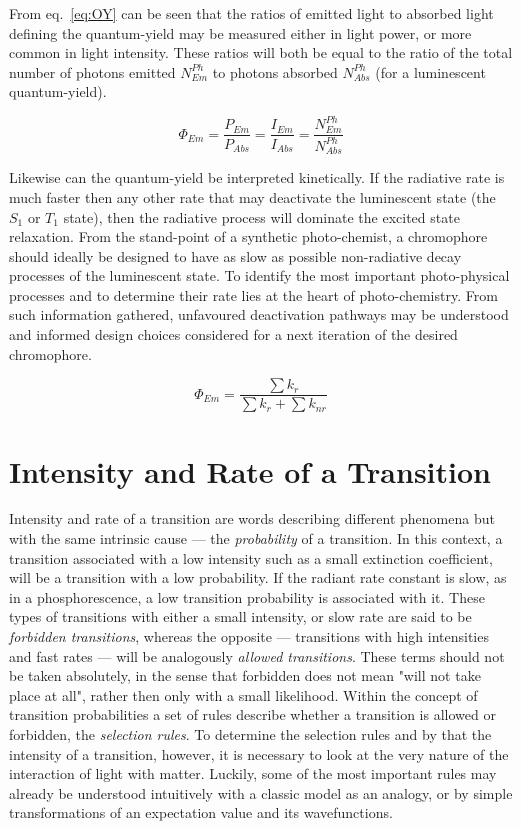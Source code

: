 			From eq.~\ref{eq:OY} can be seen that the ratios of emitted light to absorbed light defining the quantum-yield may be measured either in light power, or more common in light intensity. These ratios will both be equal to the ratio of the total number of photons emitted $N_{Em}^{Ph}$ to photons absorbed $N_{Abs}^{Ph}$ (for a luminescent quantum-yield).

			\begin{equation}
				\label{eq:QY}
		 		\Phi_{Em} = \frac{P_{Em}}{P_{Abs}} = \frac{I_{Em}}{I_{Abs}} = \frac{N_{Em}^{Ph}}{N_{Abs}^{Ph}}
			\end{equation}

			Likewise can the quantum-yield be interpreted kinetically. If the radiative rate is much faster then any other rate that may deactivate the luminescent state (the $S_1$ or $T_1$ state), then the radiative process will dominate the excited state relaxation. From the stand-point of a synthetic photo-chemist, a chromophore should ideally be designed to have as slow as possible non-radiative decay processes of the luminescent state. To identify the most important photo-physical processes and to determine their rate lies at the heart of photo-chemistry. From such information gathered, unfavoured deactivation pathways may be understood and informed design choices considered for a next iteration of the desired chromophore.

			\begin{equation}
				\label{eq:QYkin}
		 		\Phi_{Em} = \frac{\sum k_r}{\sum k_r + \sum k_{nr}} 
			\end{equation}



	\section{Intensity and Rate of a Transition}
	\label{sec:laws}
	Intensity and rate of a transition are words describing different phenomena but with the same intrinsic cause --- the \emph{probability} of a transition. In this context, a transition associated with a low intensity such as a small extinction coefficient, will be a transition with a low probability. If the radiant rate constant is slow, as in a phosphorescence, a low transition probability is associated with it. These types of transitions with either a small intensity, or slow rate are said to be \emph{forbidden transitions}, whereas the opposite --- transitions with high intensities and fast rates --- will be analogously \emph{allowed transitions}. These terms should not be taken absolutely, in the sense that forbidden does not mean "will not take place at all", rather then only with a small likelihood. Within the concept of transition probabilities a set of rules describe whether a transition is allowed or forbidden, the \emph{selection rules}. To determine the selection rules and by that the intensity of a transition, however, it is necessary to look at the very nature of the interaction of light with matter. Luckily, some of the most important rules may already be understood intuitively with a classic model as an analogy, or by simple transformations of an expectation value and its wavefunctions.

